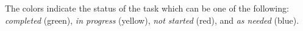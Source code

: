 The colors indicate the status of the task which can be one of the following: \emph{completed} (green), \emph{in progress} (yellow), \emph{not started} (red), and \emph{as needed} (blue).
